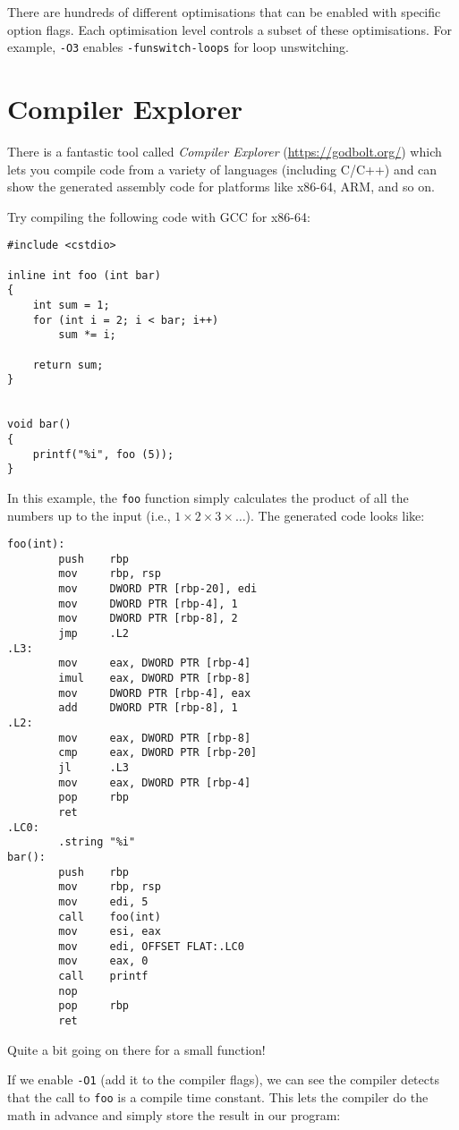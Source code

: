 \documentclass[a4paper,11pt]{article}
\newcommand{\code}[1]{\texttt{#1}}
\begin{document}
There are hundreds of different optimisations that can be enabled with
specific option flags.  Each optimisation level controls a subset of
these optimisations.  For example, \code{-O3} enables
\code{-funswitch-loops} for loop unswitching.


\section{Compiler Explorer}

There is a fantastic tool called \emph{Compiler Explorer}
(\url{https://godbolt.org/}) which lets you compile code from a variety of
languages (including C/C++) and can show the generated assembly code for
platforms like x86-64, ARM, and so on.

Try compiling the following code with GCC for x86-64:
\begin{verbatim}
#include <cstdio>

inline int foo (int bar)
{
    int sum = 1;
    for (int i = 2; i < bar; i++)
        sum *= i;

    return sum;
}


void bar()
{
    printf("%i", foo (5));
}
\end{verbatim}

In this example, the \code{foo} function simply calculates the product of all
the numbers up to the input (i.e., $1 \times 2 \times 3 \times \ldots$). The
generated code looks like:

\begin{verbatim}
foo(int):
        push    rbp
        mov     rbp, rsp
        mov     DWORD PTR [rbp-20], edi
        mov     DWORD PTR [rbp-4], 1
        mov     DWORD PTR [rbp-8], 2
        jmp     .L2
.L3:
        mov     eax, DWORD PTR [rbp-4]
        imul    eax, DWORD PTR [rbp-8]
        mov     DWORD PTR [rbp-4], eax
        add     DWORD PTR [rbp-8], 1
.L2:
        mov     eax, DWORD PTR [rbp-8]
        cmp     eax, DWORD PTR [rbp-20]
        jl      .L3
        mov     eax, DWORD PTR [rbp-4]
        pop     rbp
        ret
.LC0:
        .string "%i"
bar():
        push    rbp
        mov     rbp, rsp
        mov     edi, 5
        call    foo(int)
        mov     esi, eax
        mov     edi, OFFSET FLAT:.LC0
        mov     eax, 0
        call    printf
        nop
        pop     rbp
        ret
\end{verbatim}

Quite a bit going on there for a small function!

If we enable \code{-O1} (add it to the compiler flags), we can see the compiler
detects that the call to \code{foo} is a compile time constant. This lets the
compiler do the math in advance and simply store the result in our program:
\end{document}
